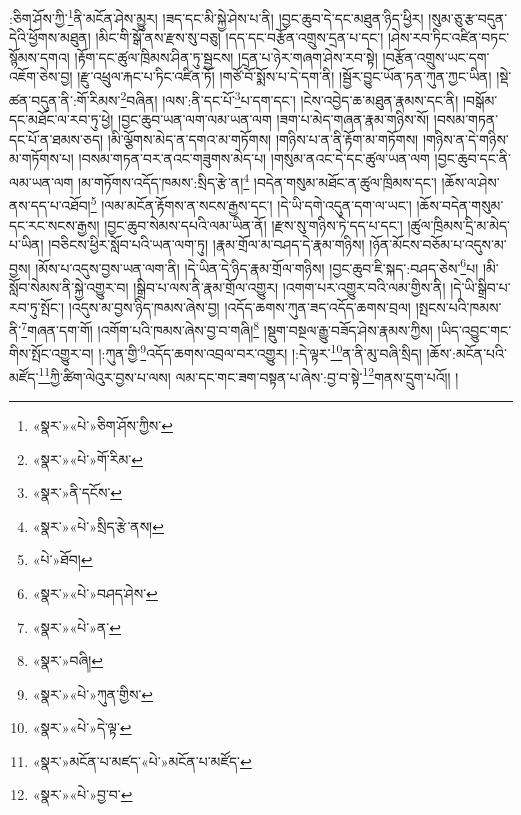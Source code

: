 :ཅིག་ཤོས་ཀྱི་\footnote{«སྣར་»«པེ་»ཅིག་ཤོས་ཀྱིས་}ནི་མངོན་ཤེས་མྱུར། །ཟད་དང་མི་སྐྱེ་ཤེས་པ་ནི། །བྱང་ཆུབ་དེ་དང་མཐུན་ཉིད་ཕྱིར། །སུམ་ཅུ་རྩ་བདུན་དེའི་ཕྱོགས་མཐུན། །མིང་གི་སྒོ་ནས་རྫས་སུ་བཅུ། །དད་དང་བརྩོན་འགྲུས་དྲན་པ་དང་། །ཤེས་རབ་ཏིང་འཛིན་བཏང་སྙོམས་དགའ། །རྟོག་དང་ཚུལ་ཁྲིམས་ཤིན་ཏུ་སྦྱངས། །དྲན་པ་ཉེར་གཞག་ཤེས་རབ་སྟེ། །བརྩོན་འགྲུས་ཡང་དག་འཇོག་ཅེས་བྱ། །རྫུ་འཕྲུལ་རྐང་པ་ཏིང་འཛིན་ཏོ། །གཙོ་བོ་སྨོས་པ་དེ་དག་ནི། །སྦྱོར་བྱུང་ཡོན་ཏན་ཀུན་ཀྱང་ཡིན། །སྡེ་ཚན་བདུན་ནི་:གོ་རིམས་\footnote{«སྣར་»«པེ་»གོ་རིམ་}བཞིན། །ལས་:ནི་དང་པོ་\footnote{«སྣར་»ནི་དངོས་}པ་དག་དང་། །ངེས་འབྱེད་ཆ་མཐུན་རྣམས་དང་ནི། །བསྒོམ་དང་མཐོང་ལ་རབ་ཏུ་ཕྱེ། །བྱང་ཆུབ་ཡན་ལག་ལམ་ཡན་ལག །ཟག་པ་མེད་གཞན་རྣམ་གཉིས་སོ། །བསམ་གཏན་དང་པོ་ན་ཐམས་ཅད། །མི་ལྕོགས་མེད་ན་དགའ་མ་གཏོགས། །གཉིས་པ་ན་ནི་རྟོག་མ་གཏོགས། །གཉིས་ན་དེ་གཉིས་མ་གཏོགས་པ། །བསམ་གཏན་བར་ནའང་གཟུགས་མེད་པ། །གསུམ་ནའང་དེ་དང་ཚུལ་ཡན་ལག །བྱང་ཆུབ་དང་ནི་ལམ་ཡན་ལག །མ་གཏོགས་འདོད་ཁམས་:སྲིད་རྩེ་ན།\footnote{«སྣར་»«པེ་»སྲིད་རྩེ་ནས།} །བདེན་གསུམ་མཐོང་ན་ཚུལ་ཁྲིམས་དང་། །ཆོས་ལ་ཤེས་ནས་དད་པ་འཐོབ།\footnote{«པེ་»ཐོབ།} །ལམ་མངོན་རྟོགས་ན་སངས་རྒྱས་དང་། །དེ་ཡི་དགེ་འདུན་དག་ལ་ཡང་། །ཆོས་བདེན་གསུམ་དང་རང་སངས་རྒྱས། །བྱང་ཆུབ་སེམས་དཔའི་ལམ་ཡིན་ནོ། །རྫས་སུ་གཉིས་ཏེ་དད་པ་དང་། །ཚུལ་ཁྲིམས་དྲི་མ་མེད་པ་ཡིན། །བཅིངས་ཕྱིར་སློབ་པའི་ཡན་ལག་ཏུ། །རྣམ་གྲོལ་མ་བཤད་དེ་རྣམ་གཉིས། །ཉོན་མོངས་བཅོམ་པ་འདུས་མ་བྱས། །མོས་པ་འདུས་བྱས་ཡན་ལག་ནི། །དེ་ཡིན་དེ་ཉིད་རྣམ་གྲོལ་གཉིས། །བྱང་ཆུབ་ཇི་སྐད་:བཤད་ཅེས་\footnote{«སྣར་»«པེ་»བཤད་ཤེས་}པ། །མི་སློབ་སེམས་ནི་སྐྱེ་འགྱུར་བ། །སྒྲིབ་པ་ལས་ནི་རྣམ་གྲོལ་འགྱུར། །འགག་པར་འགྱུར་བའི་ལམ་གྱིས་ནི། །དེ་ཡི་སྒྲིབ་པ་རབ་ཏུ་སྤོང་། །འདུས་མ་བྱས་ཉིད་ཁམས་ཞེས་བྱ། །འདོད་ཆགས་ཀུན་ཟད་འདོད་ཆགས་བྲལ། །སྤངས་པའི་ཁམས་ནི་\footnote{«སྣར་»«པེ་»ན་}གཞན་དག་གོ། །འགོག་པའི་ཁམས་ཞེས་བྱ་བ་གཞི།\footnote{«སྣར་»བཞི།} །སྡུག་བསྔལ་རྒྱུ་བཟོད་ཤེས་རྣམས་ཀྱིས། །ཡིད་འབྱུང་གང་གིས་སྤོང་འགྱུར་བ། །:ཀུན་གྱི་\footnote{«སྣར་»«པེ་»ཀུན་གྱིས་}འདོད་ཆགས་འབྲལ་བར་འགྱུར། །:དེ་ལྟར་\footnote{«སྣར་»«པེ་»དེ་ལྟ་}ན་ནི་མུ་བཞི་སྲིད། །ཆོས་:མངོན་པའི་མཛོད་\footnote{«སྣར་»མངོན་པ་མཛད་«པེ་»མངོན་པ་མཛོད་}ཀྱི་ཚིག་ལེའུར་བྱས་པ་ལས། ལམ་དང་གང་ཟག་བསྟན་པ་ཞེས་:བྱ་བ་སྟེ་\footnote{«སྣར་»«པེ་»བྱ་བ་}གནས་དྲུག་པའོ།། །
